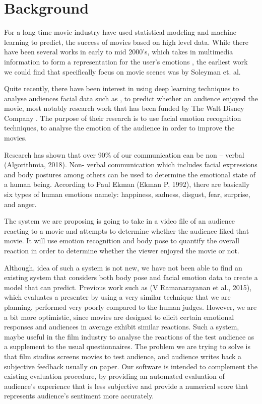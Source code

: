 \documentclass[12pt,a4paper,man]{report}
\begin{document}
\chapter{Background}
\label{sec:org7db903c}
For a long time movie industry have used statistical modeling and machine learning to predict, the success of movies based on high level data. While there have been several works in early to mid 2000’s, which takes in multimedia information to form a representation for the user’s emotions \cite{Shiliang_Zhang_2008,wu2008interactive}, the earliest work we could find that specifically focus on movie scenes was by Soleyman et. al.

Quite recently, there have been interest in using deep learning techniques to analyse audiences facial data such as \cite{saha2018unsupervised}, to predict whether an audience enjoyed the movie, most notably research work that has been funded by The Walt Disney Company \cite{Deng_2017}. The purpose of their research is to use facial emotion recognition techniques, to analyse the emotion of the audience in order to improve the movies.

Research has shown that over 90\% of our communication can be non – verbal (Algorithmia, 2018). Non- verbal communication which includes facial expressions and body postures among others can be used to determine the emotional state of a human being. According to Paul Ekman (Ekman P, 1992), there are basically six types of human emotions namely:  happiness, sadness, disgust, fear, surprise, and anger. 

The system we are proposing is going to take in a video file of an audience reacting to a movie and attempts to determine whether the audience liked that movie. It will use emotion recognition and body pose to quantify the overall reaction in order to determine whether the viewer enjoyed the movie or not. 

Although, idea of such a system is not new, we have not been able to find an existing system that considers both body pose and facial emotion data to create a model that can predict. Previous work such as (V Ramanarayanan et al., 2015), which evaluates a presenter by using a very similar technique that we are planning, performed very poorly compared to the human judges. However, we are a bit more optimistic, since movies are designed to elicit certain emotional responses and audiences in average exhibit similar reactions. Such a system, maybe useful in the film industry to analyse the reactions of the test audience as a supplement to the usual questionnaires. 
The problem we are trying to solve is that film studios screens movies to test audience, and audience writes back a subjective feedback usually on paper. Our software is intended to complement the existing evaluation procedure, by providing an automated evaluation of audience's experience that is less subjective and provide a numerical score that represents audience's sentiment more accurately.
\end{document}
